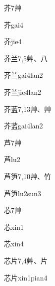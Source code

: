\begin{entry}{芥}{7}{⾋}
  \begin{phonetics}{芥}{gai4}
  \end{phonetics}
  \begin{phonetics}{芥}{jie4}
  \end{phonetics}
\end{entry}

\begin{entry}{芥兰}{7,5}{⾋、⼋}
  \begin{phonetics}{芥兰}{gai4lan2}
  \end{phonetics}
  \begin{phonetics}{芥兰}{jie4lan2}
  \end{phonetics}
\end{entry}

\begin{entry}{芥蓝}{7,13}{⾋、⾋}
  \begin{phonetics}{芥蓝}{gai4lan2}
  \end{phonetics}
\end{entry}

\begin{entry}{芦}{7}{⾋}
  \begin{phonetics}{芦}{lu2}
  \end{phonetics}
\end{entry}

\begin{entry}{芦笋}{7,10}{⾋、⽵}
  \begin{phonetics}{芦笋}{lu2sun3}
  \end{phonetics}
\end{entry}

\begin{entry}{芯}{7}{⾋}
  \begin{phonetics}{芯}{xin1}
  \end{phonetics}
  \begin{phonetics}{芯}{xin4}
  \end{phonetics}
\end{entry}

\begin{entry}{芯片}{7,4}{⾋、⽚}
  \begin{phonetics}{芯片}{xin1pian4}
  \end{phonetics}
\end{entry}

